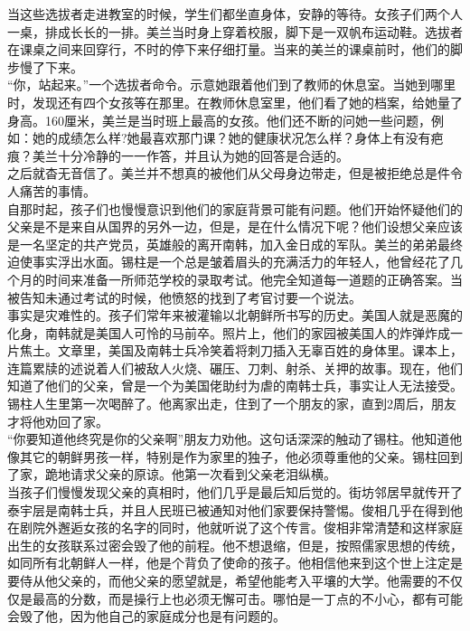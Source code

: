 \begin{multicols}{\theparacolNo}
当这些选拔者走进教室的时候，学生们都坐直身体，安静的等待。女孩子们两个人一桌，排成长长的一排。美兰当时身上穿着校服，脚下是一双帆布运动鞋。选拔者在课桌之间来回穿行，不时的停下来仔细打量。当来的美兰的课桌前时，他们的脚步慢了下来。\\

“你，站起来。”一个选拔者命令。示意她跟着他们到了教师的休息室。当她到哪里时，发现还有四个女孩等在那里。在教师休息室里，他们看了她的档案，给她量了身高。160厘米，美兰是当时班上最高的女孩。他们还不断的问她一些问题，例如：她的成绩怎么样?她最喜欢那门课？她的健康状况怎么样？身体上有没有疤痕？美兰十分冷静的一一作答，并且认为她的回答是合适的。\\

之后就杳无音信了。美兰并不想真的被他们从父母身边带走，但是被拒绝总是件令人痛苦的事情。\\

自那时起，孩子们也慢慢意识到他们的家庭背景可能有问题。他们开始怀疑他们的父亲是不是来自从国界的另外一边，但是，是在什么情况下呢？他们设想父亲应该是一名坚定的共产党员，英雄般的离开南韩，加入金日成的军队。美兰的弟弟最终迫使事实浮出水面。锡柱是一个总是皱着眉头的充满活力的年轻人，他曾经花了几个月的时间来准备一所师范学校的录取考试。他完全知道每一道题的正确答案。当被告知未通过考试的时候，他愤怒的找到了考官讨要一个说法。\\

事实是灾难性的。孩子们常年来被灌输以北朝鲜所书写的历史。美国人就是恶魔的化身，南韩就是美国人可怜的马前卒。照片上，他们的家园被美国人的炸弹炸成一片焦土。文章里，美国及南韩士兵冷笑着将刺刀插入无辜百姓的身体里。课本上，连篇累牍的述说着人们被敌人火烧、碾压、刀刺、射杀、关押的故事。现在，他们知道了他们的父亲，曾是一个为美国佬助纣为虐的南韩士兵，事实让人无法接受。锡柱人生里第一次喝醉了。他离家出走，住到了一个朋友的家，直到2周后，朋友才将他劝回了家。\\

“你要知道他终究是你的父亲啊”朋友力劝他。这句话深深的触动了锡柱。他知道他像其它的朝鲜男孩一样，特别是作为家里的独子，他必须尊重他的父亲。锡柱回到了家，跪地请求父亲的原谅。他第一次看到父亲老泪纵横。\\

当孩子们慢慢发现父亲的真相时，他们几乎是最后知后觉的。街坊邻居早就传开了泰宇层是南韩士兵，并且人民班已被通知对他们家要保持警惕。俊相几乎在得到他在剧院外邂逅女孩的名字的同时，他就听说了这个传言。俊相非常清楚和这样家庭出生的女孩联系过密会毁了他的前程。他不想退缩，但是，按照儒家思想的传统，如同所有北朝鲜人一样，他是个背负了使命的孩子。他相信他来到这个世上注定是要侍从他父亲的，而他父亲的愿望就是，希望他能考入平壤的大学。他需要的不仅仅是最高的分数，而是操行上也必须无懈可击。哪怕是一丁点的不小心，都有可能会毁了他，因为他自己的家庭成分也是有问题的。\\


\end{multicols}
